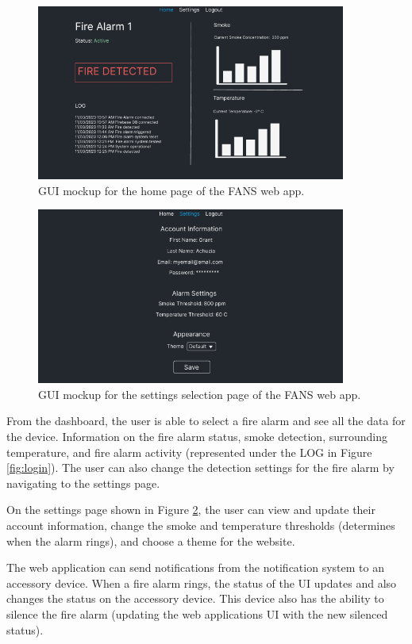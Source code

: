 \begin{figure}[H]
    \centering
    \includegraphics[width=4in]{../assets/HomePage.png}
    \caption{GUI mockup for the home page of the FANS web app.}
    \label{fig:homepage}
\end{figure}

\begin{figure}[H]
    \centering
    \includegraphics[width=4in]{../assets/SettingsPage.png}
    \caption{GUI mockup for the settings selection page of the FANS web app.}
    \label{fig:settings}
\end{figure}

From the dashboard, the user is able to select a fire alarm and see all the data for the device. Information on the
fire alarm status, smoke detection, surrounding temperature, and fire alarm activity (represented under the LOG in
Figure \ref{fig:login}). The user can also change the detection settings for the fire alarm by navigating to the
settings page.

On the settings page shown in Figure \ref{fig:settings}, the user can view and update their account information, change
the smoke and temperature thresholds (determines when the alarm rings), and choose a theme for the website.

The web application can send notifications from the notification system to an accessory device. When a fire alarm
rings, the status of the UI updates and also changes the status on the accessory device. This device also has the
ability to silence the fire alarm (updating the web applications UI with the new silenced status).

